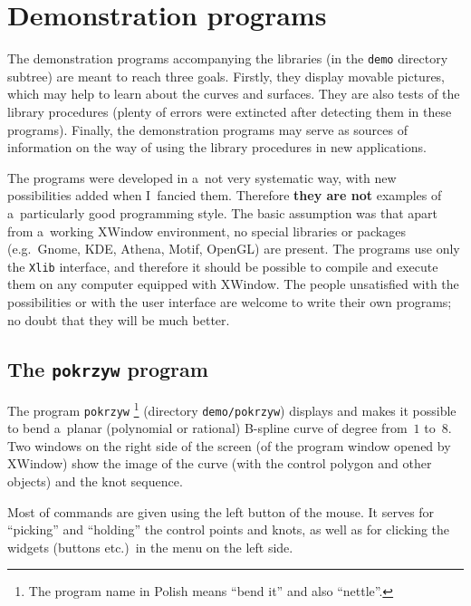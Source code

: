 

\chapter{Demonstration programs}

The demonstration programs accompanying the libraries (in the
\texttt{demo} directory subtree) are meant to reach three goals.
Firstly, they display movable pictures, which may help to learn about
the curves and surfaces. They are also tests of the library procedures
(plenty of errors were extincted after detecting them in these programs).
Finally, the demonstration programs may serve as sources of information
on the way of using the library procedures in new applications.

The programs were developed in a~not very systematic way, with new
possibilities added when I~fancied them. Therefore \textbf{they are not}
examples of a~particularly good programming style. The basic assumption
was that apart from a~working XWindow environment, no special
libraries or packages (e.g.\ Gnome, KDE, Athena, Motif, OpenGL)
are present. The programs use only the \texttt{Xlib} interface,
and therefore it should be possible to compile and execute them on
any computer equipped with XWindow. The people unsatisfied with
the possibilities or with the user interface are welcome to write
their own programs; no doubt that they will be much better.


\section{The \texttt{pokrzyw} program}

The program \texttt{pokrzyw}%
\footnote{The program name in Polish means ``bend it'' and also ``nettle''.}
(directory \texttt{demo/pokrzyw}) displays and makes it possible to bend
a~planar (polynomial or rational) B-spline curve of degree from~$1$ to~$8$.
Two windows on the right side of the screen (of the program window opened
by XWindow) show the image of the curve (with the control polygon and
other objects) and the knot sequence.

Most of commands are given using the left button of the mouse.
It serves for ``picking'' and ``holding'' the control points and knots,
as well as for clicking the widgets (buttons etc.)\ in the menu on the
left side.

